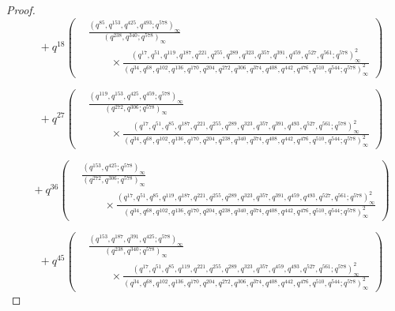 \documentclass[11pt,a4paper]{article}
\numberwithin{equation}{section}
\theoremstyle{plain}
\begin{document}
\begin{proof}
	\[
	\quad +q^{18}\left(
	\begin{aligned}
		&\frac{(q^{85}, q^{153}, q^{425}, q^{493}; q^{578})_{\infty}}
		{(q^{238}, q^{340}; q^{578})_{\infty}} \\
		&\qquad \times
		\frac{
			(q^{17}, q^{51}, q^{119}, q^{187}, q^{221}, q^{255}, q^{289}, q^{323}, q^{357}, q^{391}, q^{459}, q^{527}, q^{561}; q^{578})_{\infty}^{2}
		}{
		(q^{34}, q^{68}, q^{102}, q^{136}, q^{170},  q^{204}, q^{272}, q^{306}, q^{374}, q^{408}, q^{442}, q^{476}, q^{510}, q^{544}; q^{578})_{\infty}^{2}
	    }
	\end{aligned} 
	\right)
	\]
	
	\[
	\quad +q^{27}\left(
	\begin{aligned}
		&\frac{(q^{119}, q^{153}, q^{425}, q^{459}; q^{578})_{\infty}}
		{(q^{272}, q^{306}; q^{578})_{\infty}} \\ 
		&\qquad \times
		\frac{
			(q^{17}, q^{51}, q^{85}, q^{187}, q^{221}, q^{255}, q^{289}, q^{323}, q^{357}, q^{391},  q^{493}, q^{527},  q^{561}; q^{578})_{\infty}^{2}}{(q^{34}, q^{68}, q^{102}, q^{136}, q^{170},  q^{204}, q^{238}, q^{340}, q^{374}, q^{408},  q^{442}, q^{476}, q^{510}, q^{544}; q^{578})_{\infty}^{2}} 
	\end{aligned}
	\right)
	\]
	
	\[
	\quad +q^{36}\left(
	\begin{aligned}
			&\frac{(q^{153},q^{425}; q^{578})_{\infty}}
			{(q^{272}, q^{306}; q^{578})_{\infty}} \\
			&\qquad \times
			\frac{(q^{17}, q^{51}, q^{85}, q^{119}, q^{187}, q^{221}, q^{255}, q^{289}, q^{323}, q^{357}, q^{391}, q^{459}, q^{493}, q^{527}, q^{561}; q^{578})_{\infty}^{2}}{(q^{34}, q^{68}, q^{102}, q^{136}, q^{170}, q^{204}, q^{238}, q^{340}, q^{374}, q^{408}, q^{442}, q^{476}, q^{510}, q^{544}; q^{578})_{\infty}^{2}}
	\end{aligned}
	\right) 
	\]
	
	\[
	\quad +q^{45}\left(
	\begin{aligned}
		&\frac{(q^{153}, q^{187}, q^{391}, q^{425}; q^{578})_{\infty}}{(q^{238}, q^{340}; q^{578})_{\infty}} \\
		&\qquad \times
		\frac{(q^{17}, q^{51}, q^{85}, q^{119}, q^{221}, q^{255}, q^{289}, q^{323}, q^{357}, q^{459}, q^{493}, q^{527}, q^{561}; q^{578})_{\infty}^{2}}{(q^{34}, q^{68}, q^{102}, q^{136}, q^{170}, q^{204}, q^{272}, q^{306}, q^{374}, q^{408},  q^{442}, q^{476}, q^{510}, q^{544}; q^{578})_{\infty}^{2}}
	\end{aligned} 
	\right)
	\]
	

\end{proof}
\end{document}
